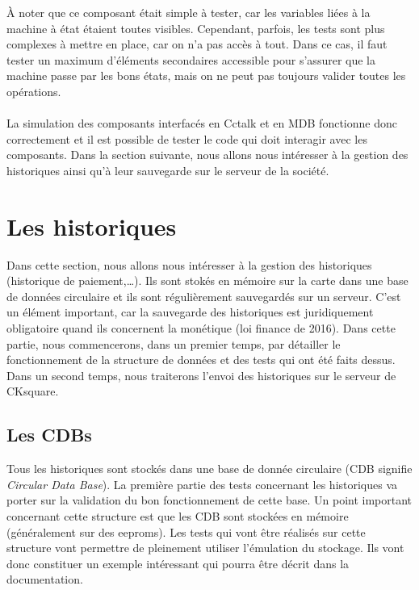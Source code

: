 \documentclass[a4paper]{article}
\begin{document}
À noter que ce composant était simple à tester, car les variables liées à la
machine à état étaient toutes visibles. Cependant, parfois, les tests sont plus
complexes à mettre en place, car on n'a pas accès à tout. Dans ce cas, il faut
tester un maximum d'éléments secondaires accessible pour s'assurer que la
machine passe par les bons états, mais on ne peut pas toujours valider toutes les
opérations.\\~\\

La simulation des composants interfacés en Cctalk et en MDB fonctionne donc
correctement et il est possible de tester le code qui doit interagir avec les
composants. Dans la section suivante, nous allons nous intéresser à la gestion
des historiques ainsi qu'à leur sauvegarde sur le serveur de la société.
\section{Les historiques}%

Dans cette section, nous allons nous intéresser à la gestion des historiques
(historique de paiement,\dots). Ils sont stokés en mémoire sur la carte dans
une base de données circulaire et ils sont régulièrement sauvegardés sur un
serveur. C'est un élément important, car la sauvegarde des historiques est
juridiquement obligatoire quand ils concernent la monétique (loi finance de
2016). Dans cette partie, nous commencerons, dans un premier temps, par
détailler le fonctionnement de la structure de données et des tests qui ont
été faits dessus. Dans un second temps, nous traiterons l'envoi des
historiques sur le serveur de CKsquare.

\subsection{Les CDBs}
\label{cdbs}

Tous les historiques sont stockés dans une base de donnée circulaire (CDB
signifie \textit{Circular Data Base}). La première partie des tests concernant
les historiques va porter sur la validation du bon fonctionnement de cette base.
Un point important concernant cette structure est que les CDB sont stockées en
mémoire (généralement sur des eeproms). Les tests qui vont être réalisés sur
cette structure vont permettre de pleinement utiliser l'émulation du stockage.
Ils vont donc constituer un exemple intéressant qui pourra être décrit dans la
documentation.\\
\end{document}
